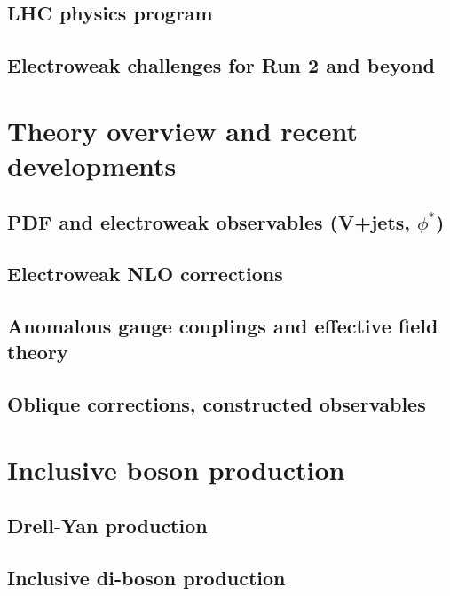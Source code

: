 \documentclass[12pt]{iopart}
\begin{document}
\subsection{LHC physics program}
\subsection{Electroweak challenges for Run 2 and beyond}

\section{Theory overview and recent developments}
\subsection{PDF and electroweak observables (V+jets, $\phi^*$)}
\subsection{Electroweak NLO corrections}
\subsection{Anomalous gauge couplings and effective field theory}
\subsection{Oblique corrections, constructed observables}


\section{Inclusive boson production}
\subsection{Drell-Yan production}
\label{ss-inclboson-drellyan}

\subsection{Inclusive di-boson production}





\end{document}
